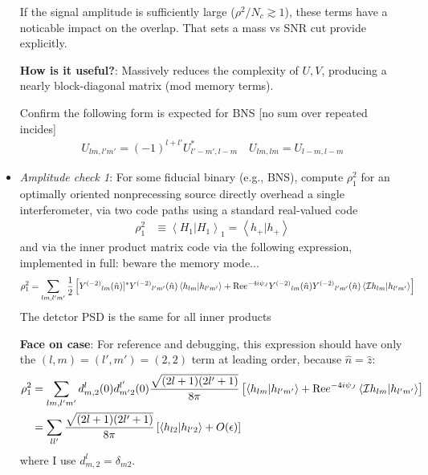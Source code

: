 \documentclass[twocolumn,prd,nofootinbib]{revtex4}
\newcommand\editremark[1]{{\color{red} #1}}
\newcommand\Y[1]{Y^{(#1)}{}}
\newcommand\qmstateproduct[2]{\left\langle#1|#2\right\rangle}
\begin{document}
\begin{widetext}
\begin{itemize}
\begin{shaded}
If the signal amplitude is sufficiently large ($ \rho^2/N_c \gtrsim 1$), these terms have a noticable impact on the
overlap.  That sets a mass vs SNR cut \editremark{provide explicitly}. 

%

\noindent \textbf{How is it useful?}: Massively reduces the complexity of $U,V$, producing a nearly block-diagonal
matrix (mod memory terms).
\end{shaded}

Confirm the following form is expected for BNS [no sum over repeated incides]
\begin{eqnarray}
U_{lm,l'm'} =(-1)^{l+l'}U_{l'-m',l-m}^* \quad  U_{lm,lm} = U_{l-m,l-m}
\end{eqnarray}

\item \emph{Amplitude check 1}: For some fiducial binary (e.g., BNS), compute $\rho_1^2$ for an optimally oriented nonprecessing source directly overhead a
  single interferometer, via two code paths using a standard real-valued code
\begin{align}
\rho^2_1 &\equiv\qmstateproduct{H_1}{H_1}_1 = \qmstateproduct{h_+}{h_+} 
\end{align}
and via the inner product matrix code  via the following expression, implemented in full: \editremark{beware the memory mode...}
\begin{align}
\rho^2_1& = \sum_{lm,l'm'} \frac{1}{2} \left[ \Y{-2}_{lm}(\hat{n})]^*\Y{-2}_{l'm'}(\hat{n})\qmstateproduct{h_{lm}}{h_{l'm'}}
  +\text{Re}e^{-4i\psi_J}\Y{-2}_{lm}(\hat{n})\Y{-2}_{l'm'}(\hat{n})\qmstateproduct{{\cal I}h_{lm}}{h_{l'm'}} \right]
\end{align}
The detctor PSD is the same for all inner products
\begin{shaded}
\noindent \textbf{Face on case}: For reference and debugging, this expression  should have only the $(l,m)=(l',m')=(2,2)$ term at leading order, because $\hat{n}=\hat{z}$:
\begin{align}
 \rho_1^2&= \sum_{lm,l'm'}d^l_{m,2}(0)d^{l'}_{m'2}(0) \frac{\sqrt{(2l+1)(2l'+1)}}{8\pi} \left[\qmstateproduct{h_{lm}}{h_{l'm'}} 
 +  \text{Re}e^{-4i\psi_J}  \qmstateproduct{{\cal I}h_{lm}}{h_{l'm'}}
\right] \\
 &= \sum_{ll'}\frac{\sqrt{(2l+1)(2l'+1)}}{8\pi} \left[\qmstateproduct{h_{l2}}{h_{l'2}}  + O(\epsilon)
\right]
\end{align}
where I use $d^l_{m,2}=\delta_{m2}$.



\end{shaded}
\end{itemize}
\end{widetext}
\end{document}
